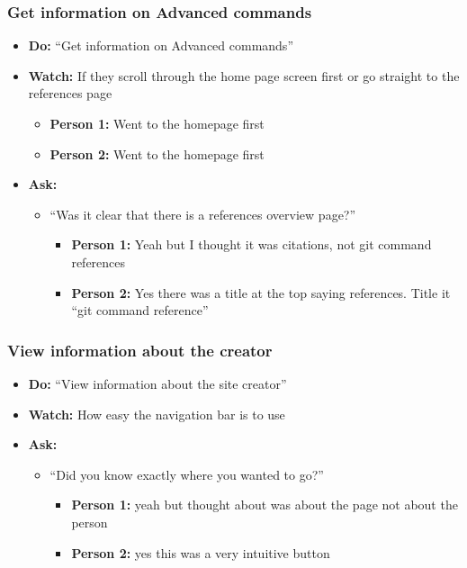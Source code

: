 \subsubsection{Get information on Advanced commands}
\begin{itemize}
	\item\textbf{Do:} ``Get information on Advanced commands''
	\item\textbf{Watch:} If they scroll through the home page screen first or go straight to the references page
	\begin{itemize}
		\item\textbf{Person 1:} Went to the homepage first
		\item\textbf{Person 2:} Went to the homepage first
	\end{itemize}
	\item\textbf{Ask:}
	\begin{itemize}
		\item ``Was it clear that there is a references overview page?''
		\begin{itemize}
			\item\textbf{Person 1:} Yeah but I thought it was citations, not git command references
			\item\textbf{Person 2:} Yes there was a title at the top saying references. Title it ``git command reference''
		\end{itemize}
	\end{itemize}	
\end{itemize}


\subsubsection{View information about the creator}
\begin{itemize}
	\item\textbf{Do:} ``View information about the site creator''
	\item\textbf{Watch:} How easy the navigation bar is to use
	\item\textbf{Ask:}
	\begin{itemize}
		\item ``Did you know exactly where you wanted to go?''
		\begin{itemize}
			\item\textbf{Person 1:} yeah but thought about was about the page not about the person
			\item\textbf{Person 2:} yes this was a very intuitive button
		\end{itemize}
	\end{itemize}	
\end{itemize}


